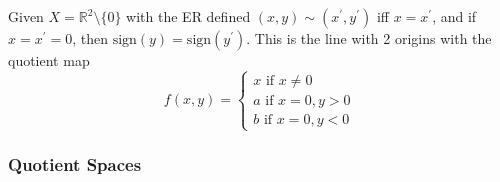     \begin{example}
      \label{quotient_hausdorff}
      Given $X = \mathbb{R}^2 \setminus \{0\}$ with the ER defined $(x, y) \sim (x^\prime, y^\prime)$ iff $x = x^\prime$, and if $x = x^\prime = 0$, then $\mathrm{sign}(y) = \mathrm{sign}(y^\prime)$. This is the line with 2 origins with the quotient map 
      \begin{equation}
        f(x, y) = \begin{cases} 
          x \text{ if } x \neq 0 \\
          a \text{ if } x = 0, y > 0 \\ 
          b \text{ if } x = 0, y < 0
        \end{cases}
      \end{equation}
    \end{example}

  \subsubsection{Quotient Spaces}

